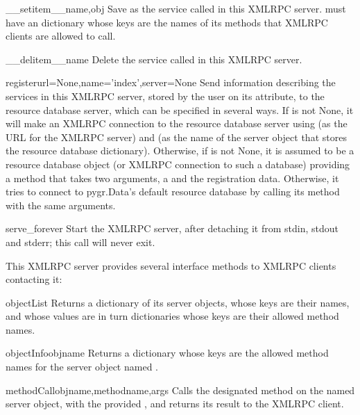 \documentclass{howto}
\begin{document}
\begin{funcdesc}{__setitem__}{name,obj}
  Save  as the service called  in this XMLRPC server.
   must have an  dictionary whose
  keys are the names of its methods that XMLRPC clients are allowed
  to call.
\end{funcdesc}
\begin{funcdesc}{__delitem__}{name}
  Delete the service called  in this XMLRPC server.
\end{funcdesc}
\begin{funcdesc}{register}{url=None,name='index',server=None}
  Send information describing the services in this XMLRPC server,
  stored by the user on its  attribute,
  to the resource database server, which can be specified in 
  several ways.  If  is not None, it will make an XMLRPC
  connection to the resource database server using  (as the
  URL for the XMLRPC server) and  (as the name of the server
  object that stores the resource database dictionary).  Otherwise,
  if  is not None, it is assumed to be a resource database
  object (or XMLRPC connection to such a database) providing a
   method that takes two arguments,
  a  and the registration data.  Otherwise,
  it tries to connect to pygr.Data's default resource database
  by calling its  method with the
  same arguments.
\end{funcdesc}
\begin{funcdesc}{serve_forever}{}
  Start the XMLRPC server, after detaching it from
  stdin, stdout and stderr; this call will never exit.
\end{funcdesc}

This XMLRPC server provides several interface methods to
XMLRPC clients contacting it:
\begin{funcdesc}{objectList}{}
  Returns a dictionary of its server objects, whose keys are their
  names, and whose values are in turn dictionaries whose keys are
  their allowed method names.
\end{funcdesc}
\begin{funcdesc}{objectInfo}{objname}
  Returns a dictionary whose keys are the allowed method names for
  the server object named .
\end{funcdesc}
\begin{funcdesc}{methodCall}{objname,methodname,args}
  Calls the designated method on the named server object, with the
  provided , and returns its result to the XMLRPC client.
\end{funcdesc}
\end{document}
